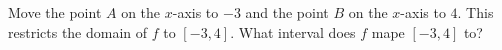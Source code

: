 \documentclass{ximera}
\author{Kevin James}
\begin{document}
   \begin{exercise}
   	  \begin{center}
   	  \end{center}
   	 Move the point $ A $ on the $ x $-axis to $ -3 $ and the point $ B $ on the $ x $-axis to $ 4 $.  This restricts the domain of $ f $ to $ [-3, 4] $.  What interval does $ f $ mape $ [-3, 4] $ to?
   	 \begin{multipleChoice}
   	   \choice{$ \left[f(-3), f(4)\right] $}
   	   \choice{$ [1.576, -1.2] $}
   	   \choice[correct]{$ [-1.428, 2.102] $}
   	 \end{multipleChoice}
    
   \end{exercise}
\end{document}
